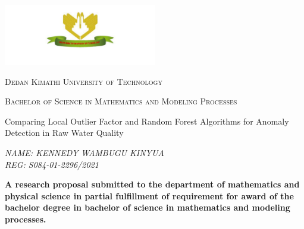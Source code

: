 \begin{titlepage}

	\centering
			\includegraphics[width=0.5\textwidth]{dekut.png}
		
		\vspace{1cm}
		{\scshape\LARGE Dedan Kimathi University of Technology\par}
		\vspace{1cm}
		{\scshape\Large Bachelor of Science in Mathematics and Modeling Processes\par}
		\vspace{1.5cm}
		{\huge Comparing Local Outlier Factor and Random Forest Algorithms for Anomaly Detection in Raw Water Quality\par}
		\vspace{1cm}
		{\large\itshape NAME: KENNEDY WAMBUGU KINYUA\\REG: S084-01-2296/2021\par}
		\vfill
		\large \textbf{A research proposal submitted to the department of mathematics and physical science in partial fulfillment of requirement for award of the bachelor degree in bachelor of science in mathematics and modeling processes.}
\end{titlepage}
